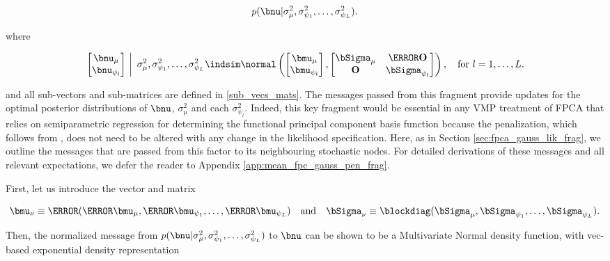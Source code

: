 \documentclass[12pt]{article}
\def\Sigmanu{\bSigma_{\nu}}
\def\munu{\bmu_{\nu}}
\def\sigsqmu{\sigma^2_{\mu}}
\def\mumu{\bmu_\mu}
\def\numu{\bnu_\mu}
\newcommand\nupsi[1]{\bnu_{\psi_{#1}}}
\newcommand\sigsqpsi[1]{\sigma^2_{\psi_{#1}}}
\newcommand\mupsi[1]{\bmu_{\psi_#1}}
\theoremstyle{plain}
\theoremstyle{definition}
\theoremstyle{remark}
\begin{document}
\[
	p (\bnu | \sigsqmu, \sigsqpsi{1}, \dots, \sigsqpsi{L}).
\]

\noindent where

\begin{equation}
	\left.\begin{bmatrix}
		\numu \\
		\nupsi{l}
	\end{bmatrix} \ \right| \ \sigsqmu, \sigsqpsi{1}, \dots, \sigsqpsi{L}
		\indsim
			\normal \left(
				\begin{bmatrix}
					\bmu_\mu \\
					\bmu_{\psi_l} \\
				\end{bmatrix},
				\begin{bmatrix}
					\bSigma_\mu & \T{\textbf{O}} \\
					\textbf{O} & \bSigma_{\psi_l}
				\end{bmatrix}
			\right), \quad \text{for $l = 1, \dots, L$.}
\label{mean_fpc_gauss_pen_factor}
\end{equation}

\noindent and all sub-vectors and sub-matrices are defined in \eqref{sub_vecs_mats}.
The messages passed from this fragment provide updates for the optimal posterior distributions of $\bnu$,
$\sigsqmu$ and each $\sigsqpsi{l}$. Indeed, this key fragment would be essential in any VMP treatment
of FPCA that relies on semiparametric regression for determining the functional principal component basis
function because the penalization, which follows from , does not need to be altered with any
change in the likelihood specification. Here, as in Section
\ref{sec:fpca_gauss_lik_frag}, we outline the messages that are passed from this factor to its neighbouring
stochastic nodes. For detailed derivations of these messages and all relevant expectations, we defer the
reader to Appendix \ref{app:mean_fpc_gauss_pen_frag}.

First, let us introduce the vector and matrix

\begin{equation}
	\munu \equiv \T{(\T{\mumu}, \T{\mupsi{1}}, \dots, \T{\mupsi{L}})} \quad
	\text{and} \quad
	\Sigmanu \equiv \blockdiag (\bSigma_\mu, \bSigma_{\psi_1}, \dots, \bSigma_{\psi_L}).
\label{munu_Sigmanu}
\end{equation}

\noindent Then, the normalized message from $p (\bnu | \sigsqmu, \sigsqpsi{1}, \dots, \sigsqpsi{L})$ to $\bnu$
can be shown to be a Multivariate Normal density function, with vec-based exponential density representation
\end{document}
